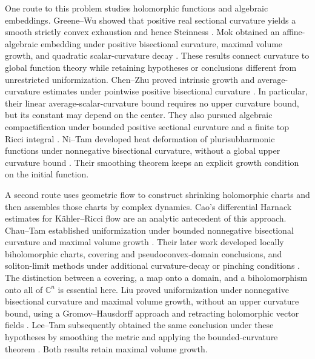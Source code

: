 \documentclass[11pt]{article}
\theoremstyle{definition}
\theoremstyle{remark}
\newcommand{\C}{\mathbb C}
\numberwithin{equation}{section}
\begin{document}
One route to this problem studies holomorphic functions and
algebraic embeddings. Greene--Wu showed that positive real sectional
curvature yields a smooth strictly convex exhaustion and hence
Steinness \cite[Theorem~10]{GreeneWuConvex1976}.
Mok obtained an affine-algebraic embedding under positive bisectional
curvature, maximal volume growth, and quadratic scalar-curvature
decay \cite{MokEmbedding1984}.
These results connect curvature to global function theory while
retaining hypotheses or conclusions different from unrestricted
uniformization. Chen--Zhu proved intrinsic growth and average-curvature
estimates under pointwise positive bisectional curvature
\cite{ChenZhu}. In particular, their linear average-scalar-curvature
bound requires no upper curvature bound, but its constant may
depend on the center. They also pursued algebraic compactification
under bounded positive sectional curvature and a finite top Ricci
integral \cite{ChenZhuPositive2009}.
Ni--Tam developed heat deformation of plurisubharmonic functions
under nonnegative bisectional curvature, without a global upper
curvature bound \cite{NiTamStructure}. Their smoothing theorem
keeps an explicit growth condition on the initial function.

A second route uses geometric flow to construct shrinking holomorphic
charts and then assembles those charts by complex dynamics.
Cao's differential Harnack estimates for K\"ahler--Ricci flow
\cite{CaoHarnack} are an analytic antecedent of this approach.
Chau--Tam established uniformization under bounded nonnegative
bisectional curvature and maximal volume growth
\cite{ChauTamComplex2006}. Their later work developed locally
biholomorphic charts, covering and pseudoconvex-domain conclusions,
and soliton-limit methods under additional curvature-decay or
pinching conditions \cite{ChauTamStein,ChauTamSimply}.
The distinction between a covering, a map onto a domain, and a
biholomorphism onto all of $\C^n$ is essential here.
Liu proved uniformization under nonnegative bisectional curvature and
maximal volume growth, without an upper curvature bound, using a
Gromov--Hausdorff approach and retracting holomorphic vector fields
\cite{LiuUniformization}.  Lee--Tam subsequently obtained the same
conclusion under these hypotheses by smoothing the metric and applying
the bounded-curvature theorem \cite{LeeTam}.  Both results retain
maximal volume growth.
\end{document}
